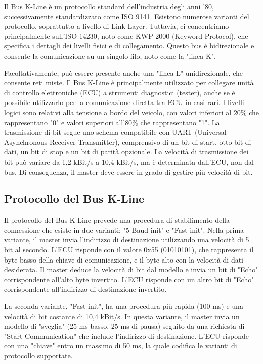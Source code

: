 Il Bus K-Line è un protocollo standard dell'industria degli anni '80, successivamente standardizzato come ISO 9141. Esistono numerose varianti del protocollo, soprattutto a livello di Link Layer. Tuttavia, ci concentriamo principalmente sull'ISO 14230, noto come KWP 2000 (Keyword Protocol), che specifica i dettagli dei livelli fisici e di collegamento. Questo bus è bidirezionale e consente la comunicazione su un singolo filo, noto come la "linea K".

Facoltativamente, può essere presente anche una "linea L" unidirezionale, che consente reti miste. Il Bus K-Line è principalmente utilizzato per collegare unità di controllo elettroniche (ECU) a strumenti diagnostici (tester), anche se è possibile utilizzarlo per la comunicazione diretta tra ECU in casi rari. I livelli logici sono relativi alla tensione a bordo del veicolo, con valori inferiori al $20\%$ che rappresentano "0" e valori superiori all'$80\%$ che rappresentano "1". La trasmissione di bit segue uno schema compatibile con UART (Universal Asynchronous Receiver Transmitter), comprensivo di un bit di start, otto bit di dati, un bit di stop e un bit di parità opzionale. La velocità di trasmissione dei bit può variare da 1,2 kBit/s a 10,4 kBit/s, ma è determinata dall'ECU, non dal bus. Di conseguenza, il master deve essere in grado di gestire più velocità di bit.

\subsection{Protocollo del Bus K-Line}

Il protocollo del Bus K-Line prevede una procedura di stabilimento della connessione che esiste in due varianti: "5 Baud init" e "Fast init". Nella prima variante, il master invia l'indirizzo di destinazione utilizzando una velocità di 5 bit al secondo. L'ECU risponde con il valore 0x55 (01010101), che rappresenta il byte basso della chiave di comunicazione, e il byte alto con la velocità di dati desiderata. Il master deduce la velocità di bit dal modello e invia un bit di "Echo" corrispondente all'alto byte invertito. L'ECU risponde con un altro bit di "Echo" corrispondente all'indirizzo di destinazione invertito.

La seconda variante, "Fast init", ha una procedura più rapida (100 ms) e una velocità di bit costante di 10,4 kBit/s. In questa variante, il master invia un modello di "sveglia" (25 ms basso, 25 ms di pausa) seguito da una richiesta di "Start Communication" che include l'indirizzo di destinazione. L'ECU risponde con una "chiave" entro un massimo di 50 ms, la quale codifica le varianti di protocollo supportate.

